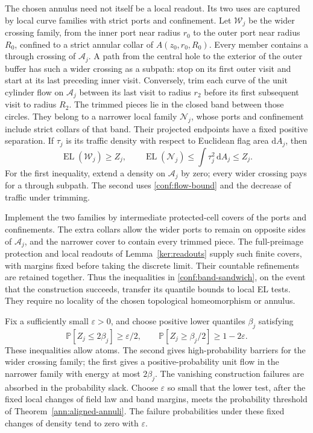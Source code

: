\documentclass[11pt]{article}
\numberwithin{equation}{section}
\theoremstyle{definition}
\theoremstyle{remark}
\newcommand{\PP}{\mathbb P}
\newcommand{\dd}{\mathrm d}
\newcommand{\1}{\mathbf 1}
\DeclareMathOperator{\EL}{EL}
\begin{document}
The chosen annulus need not itself be a local readout.  Its two uses
are captured by local curve families with strict ports and confinement.
Let \(\mathcal W_j\) be the wider crossing family, from the inner
port near radius \(r_0\) to the outer port near radius \(R_0\),
confined to a strict annular collar of \(A(z_0,r_0,R_0)\).
Every member contains a through crossing of \(\mathcal A_j\).
A path from the central hole to the exterior of the outer buffer
has such a wider crossing as a subpath: stop on its first outer
visit and start at its last preceding inner visit.  Conversely, trim each curve
of the unit cylinder flow on \(\mathcal A_j\) between its last visit
to radius \(r_2\) before its first subsequent visit to radius \(R_2\).
The trimmed pieces lie in the closed band between those circles.
They belong to a narrower local family \(\mathcal N_j\), whose
ports and confinement include strict collars of that band.  Their
projected endpoints have a fixed positive separation.  If \(\tau_j\)
is its traffic density with respect to Euclidean flag area
\(\dd A_j\), then
\begin{equation}
 \EL(\mathcal W_j)\ge Z_j,
 \qquad
 \EL(\mathcal N_j)\le\int\tau_j^2\,\dd A_j\le Z_j.
 \label{conf:band-sandwich}
\end{equation}
For the first inequality, extend a density on \(\mathcal A_j\) by
zero; every wider crossing pays for a through subpath.  The second
uses \eqref{conf:flow-bound} and the decrease of traffic under trimming.

Implement the two families by intermediate protected-cell covers of
the ports and confinements.  The extra collars allow the wider ports
to remain on opposite sides of \(\mathcal A_j\), and the narrower
cover to contain every trimmed piece.  The full-preimage protection
and local readouts of Lemma~\ref{ker:readouts} supply such finite
covers, with margins fixed before taking the discrete limit.  Their
countable refinements are retained together.  Thus the inequalities
in \eqref{conf:band-sandwich}, on the event that the construction
succeeds, transfer its quantile bounds to local EL tests.  They require
no locality of the chosen topological homeomorphism or annulus.

Fix a sufficiently small \(\varepsilon>0\), and choose positive
lower quantiles \(\beta_j\) satisfying
\begin{equation}
 \PP[Z_j\le2\beta_j]\ge\varepsilon/2,
 \qquad
 \PP[Z_j\ge\beta_j/2]\ge1-2\varepsilon.
 \label{conf:quantiles}
\end{equation}
These inequalities allow atoms.  The second gives high-probability
barriers for the wider crossing family; the first gives a
positive-probability unit flow in the narrower family with energy
at most \(2\beta_j\).  The vanishing construction failures are
absorbed in the probability slack.  Choose \(\varepsilon\) so small
that the lower test, after the fixed local changes of field law and
band margins, meets the probability threshold of
Theorem~\ref{ann:aligned-annuli}.  The failure probabilities under
these fixed changes of density tend to zero with \(\varepsilon\).
\end{document}
